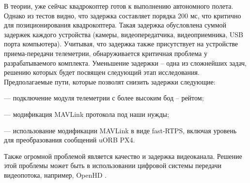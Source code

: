 В теории, уже сейчас квадрокоптер готов к выполнению автономного полета. Однако из тестов видно, что задержка составляет порядка 200 мс, что критично для позиционирования квадрокоптера. Такая задержка обусловлена суммой задержек каждого устройства (камеры, видеопередатчика, видеоприемника, USB порта компьютера). Учитывая, что задержка также присутствует на устройстве приема-передачи телеметрии, обнаруживается критичная проблема у разрабатываемого комплекта. Уменьшение задержки -- одна из сложнейших задач, решению которых будет посвящен следующий этап исследования. Предполагаемые пути, которые позволят снизить задержки следующие:

--- подключение модуля телеметрии с более высоким бод -- рейтом;

--- модификация MAVLink протокола под наши нужды;

--- использование модификации MAVLink в виде fast-RTPS, включая уровень для преобразования сообщений uORB PX4.

Также огромной проблемой является качество и задержка видеоканала. Решение этой проблемы может быть в использовании цифровой системы передачи видеопотока, например, OpenHD \cite{openhd}.

